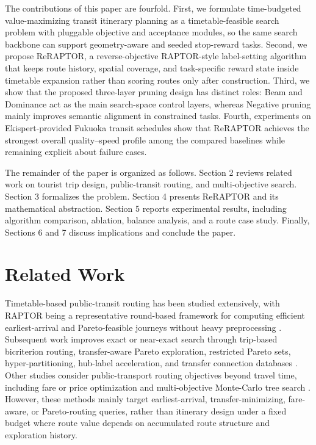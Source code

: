 The contributions of this paper are fourfold.
First, we formulate time-budgeted value-maximizing transit itinerary planning
as a timetable-feasible search problem with pluggable objective and acceptance
modules, so the same search backbone can support geometry-aware and seeded
stop-reward tasks.
Second, we propose ReRAP\-TOR, a reverse-objective RAPTOR-style label-setting
algorithm that keeps route history, spatial coverage, and task-specific reward
state inside timetable expansion rather than scoring routes only after
construction.
Third, we show that the proposed three-layer pruning design has distinct roles:
Beam and Dominance act as the main search-space control layers, whereas
Negative pruning mainly improves semantic alignment in constrained tasks.
Fourth, experiments on Ekispert-provided Fukuoka transit schedules show that
ReRAPTOR achieves the strongest overall quality--speed profile among the
compared baselines while remaining explicit about failure cases.

The remainder of the paper is organized as follows.
Section 2 reviews related work on tourist trip design, public-transit routing,
and multi-objective search.
Section 3 formalizes the problem.
Section 4 presents ReRAPTOR and its mathematical abstraction.
Section 5 reports experimental results, including algorithm comparison, ablation, balance analysis,
and a route case study.
Finally, Sections 6 and 7 discuss implications and conclude the paper.

\section{Related Work}
Timetable-based public-transit routing has been studied extensively, with RAPTOR
being a representative round-based framework for computing efficient
earliest-arrival and Pareto-feasible journeys without heavy preprocessing
\cite{delling2015raptor}. Subsequent work improves exact or near-exact search
through trip-based bicriterion routing, transfer-aware Pareto exploration,
restricted Pareto sets, hyper-partitioning, hub-label acceleration, and transfer
connection databases
\cite{abuaisha2024transferdb,agarwal2024bicriteriontb,delling2019restrictedpareto,delling2017hyperpartitioning,he2022paretojourneys,phan2019hublabeling}.
Other studies consider public-transport routing objectives beyond travel time,
including fare or price optimization and multi-objective Monte-Carlo tree search
\cite{euler2024price,weng2021mcts}. However, these methods mainly target
earliest-arrival, transfer-minimizing, fare-aware, or Pareto-routing queries,
rather than itinerary design under a fixed budget where route value depends on
accumulated route structure and exploration history.

